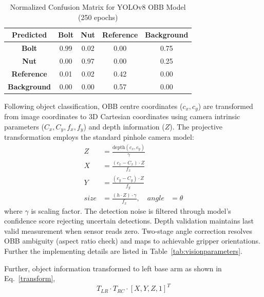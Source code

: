 \documentclass[pdflatex,sn-mathphys-num]{sn-jnl}%
\theoremstyle{thmstyleone}%
\theoremstyle{thmstylethree}%
\begin{document}
\begin{table}[t]
\centering
\caption{Normalized Confusion Matrix for YOLOv8 OBB Model (250 epochs)}
\begin{tabular}{ccccc}
\toprule
\textbf{Predicted} & \textbf{Bolt} & \textbf{Nut} & \textbf{Reference} & \textbf{Background} \\
\midrule \midrule
\textbf{Bolt} & 0.99 & 0.02 & 0.00 & 0.75 \\
\textbf{Nut} & 0.00 & 0.97 & 0.00 & 0.25 \\
\textbf{Reference} & 0.01 & 0.02 & 0.42 & 0.00 \\
\textbf{Background} & 0.00 & 0.00 & 0.57 & 0.00 \\
\bottomrule
\end{tabular}
\label{tab:confusion_matrix}
\end{table}

\noindent Following object classification, OBB centre coordinates ($c_{x}, c_{y}$) are transformed from image coordinates to 3D Cartesian coordinates using camera intrinsic parameters ($C_{x}, C_{y}, f_{x}, f_{y}$) and depth information ($Z$). The projective transformation \cite{projective_transformation} employs the standard pinhole camera model:
\begin{equation}
\begin{aligned}
Z &= \frac{\text{depth}(c_x, c_y)}{\gamma} \\[0.3em]
X &= \frac{(c_x - C_x) \cdot Z}{f_x} \\[0.3em]
Y &= \frac{(c_y - C_y) \cdot Z}{f_y} \\[0.3em]
size &= \frac{(h \cdot Z) \cdot \gamma}{f_x}, \quad angle &= \theta
\end{aligned}
\label{vision_transform}
\end{equation}
where $\gamma$ is scaling factor.
The detection noise is filtered through model's confidence score rejecting uncertain detections. Depth validation maintains last valid measurement when sensor reads zero. Two-stage angle correction resolves OBB ambiguity (aspect ratio check) and maps to achievable gripper orientations. Further the implementing details are listed in Table~\ref{tab:visionparameters}.

\noindent Further, object information transformed to left base arm as shown in Eq.~\ref{transform},
\begin{equation}
    T_{LR} \cdot T_{RC} \cdot [X, Y, Z, 1]^{T}
    \label{transform}
\end{equation}
\end{document}
